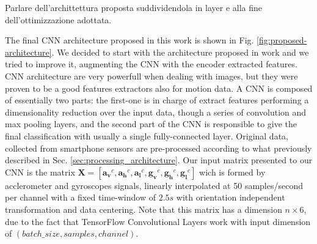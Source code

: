 Parlare dell'archittettura proposta suddividendola in layer e alla fine dell'ottimizzazione adottata.

The final CNN architecture proposed in this work is shown in Fig. \ref{fig:proposed-architecture}. We decided to start with the architecture proposed in work \cite{chen2020deep} and we tried to improve it, augmenting the CNN with the encoder extracted features. CNN architecture are very powerfull when dealing with images, but they were proven to be a good features extractors also for motion data. A CNN is composed of essentially two parts: the first-one is in charge of extract features performing a dimensionality reduction over the input data, though a series of convolution and max pooling layers, and the second part of the CNN is responsible to give the final classification with usually a single fully-connected layer. Original data, collected from smartphone sensors are pre-processed according to what previously described in Sec. \ref{sec:processing_architecture}. Our input matrix presented to our CNN is the matrix \mbox{$ \boldsymbol{X} = [ \boldsymbol{a_{v}}^{c}, \boldsymbol{a_{h}}^{c}, \boldsymbol{a_{l}}^{c}, \boldsymbol{g_{v}}^{c}, \boldsymbol{g_{h}}^{c}, \boldsymbol{g_{l}}^{c}]$} wich is formed by acclerometer and gyroscopes signals, linearly interpolated at 50 samples/second  per channel with a fixed time-window of $2.5s$ with orientation independent transformation and data centering. Note that this matrix has a dimension $n \times 6$, due to the fact that TensorFlow Convolutional Layers work with input dimension of $(batch\_size, samples, channel)$.

